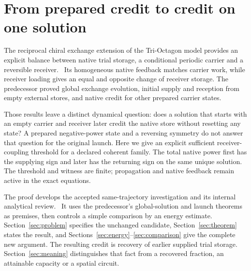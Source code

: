 \section{From prepared credit to credit on one solution}\label{sec:introduction}
The reciprocal chiral exchange extension of the Tri-Octagon model provides an explicit balance between native trial storage, a conditional periodic carrier and a reversible receiver.~\cite{baseline}
Its homogeneous native feedback matches carrier work, while receiver loading gives an equal and opposite change of receiver storage. The predecessor proved global exchange evolution, initial supply and reception from empty external stores, and native credit for other prepared carrier states.

Those results leave a distinct dynamical question: does a solution that starts with an empty carrier and receiver later credit the native store without resetting any state? A prepared negative-power state and a reversing symmetry do not answer that question for the original launch.
Here we give an explicit sufficient receiver-coupling threshold for a declared coherent family. The total native power first has the supplying sign and later has the returning sign on the same unique solution. The threshold and witness are finite; propagation and native feedback remain active in the exact equations.

The proof develops the accepted same-trajectory investigation and its internal analytical review.~\cite{investigation,review}
It uses the predecessor's global-solution and launch theorems as premises, then controls a simple comparison by an energy estimate. Section~\ref{sec:problem} specifies the unchanged candidate, Section~\ref{sec:theorem} states the result, and Sections~\ref{sec:energy}--\ref{sec:comparison} give the complete new argument.
The resulting credit is recovery of earlier supplied trial storage. Section~\ref{sec:meaning} distinguishes that fact from a recovered fraction, an attainable capacity or a spatial circuit.
